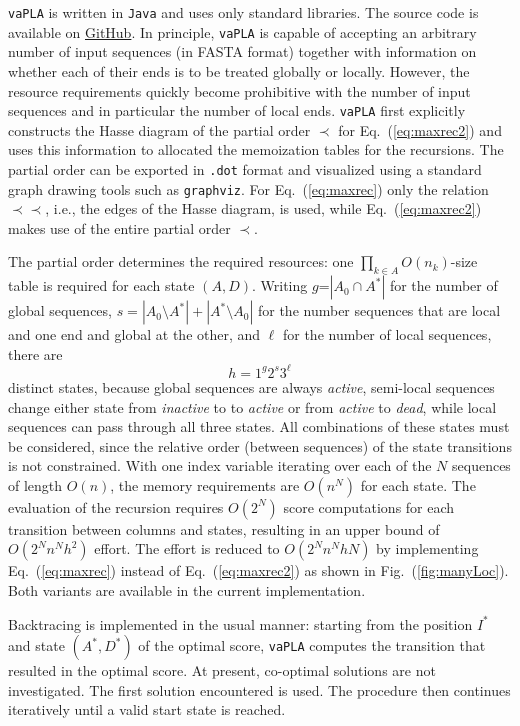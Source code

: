 \documentclass[a4paper,10pt]{article}
\newcommand{\TODO}[1]{\begingroup\color{red}#1\endgroup}
\newcommand{\pprec}{\mathrel{\prec\!\!\!\prec}}
\newcommand{\SAFTWARE}{\texttt{vaPLA}} %
\begin{document}
\SAFTWARE{} is written in \texttt{Java} and uses only standard libraries.
The source code is available on \href{https://github.com/FChurcher/vaPLA}{GitHub}.
In principle, \SAFTWARE{} is capable of accepting an arbitrary number of input
sequences (in FASTA format) together with information on whether each of
their ends is to be treated globally or locally. However, the resource
requirements quickly become prohibitive with the number of input sequences
and in particular the number of local ends. \SAFTWARE{} first explicitly
constructs the Hasse diagram of the partial order $\prec$ for
Eq.~(\ref{eq:maxrec2}) and uses this information to allocated the
memoization tables for the recursions. The partial order can be exported in
\texttt{.dot} format and visualized using a standard graph drawing tools
such as \texttt{graphviz}. For Eq.~(\ref{eq:maxrec}) only the relation
  $\pprec$, i.e., the edges of the Hasse diagram, is used, while
  Eq.~(\ref{eq:maxrec2}) makes use of the entire partial order $\prec$.

The partial order determines the required resources: one
$\prod_{k\in A} O(n_k)$-size table is required for each state $(A,D)$.
Writing $g$=$|A_0\cap A^*|$ for the number of global sequences,
$s=|A_0\setminus A^*| + |A^*\setminus A_0|$ for the number sequences that
are local and one end and global at the other, and $\ell$ for the number of
local sequences, there are
\begin{equation}
  h = 1^g 2^s 3^{\ell} 
\end{equation} 
distinct states, because global sequences are always \textit{active},
semi-local sequences change either state from \textit{inactive} to to
\textit{active} or from \textit{active} to \textit{dead}, while local
sequences can pass through all three states. All combinations of these
states must be considered, since the relative order (between sequences) of
the state transitions is not constrained. With one index variable iterating
over each of the $N$ sequences of length $O(n)$, the memory requirements
are $O(n^N)$ for each state.  The evaluation of the recursion requires
$O(2^N)$ score computations for each transition between columns and states,
resulting in an upper bound of $O(2^N n^N h^2)$ effort. The effort is
reduced to $O(2^N n^N h N)$ by implementing Eq.~(\ref{eq:maxrec})
instead of Eq.~(\ref{eq:maxrec2}) as shown in Fig.~(\ref{fig:manyLoc}).
Both variants are available in the current implementation.

Backtracing is implemented in the usual manner: starting from the position
$I^*$ and state $(A^*,D^*)$ of the optimal score, \SAFTWARE{} computes the
transition that resulted in the optimal score. At present, co-optimal
solutions are not investigated. The first solution encountered is used. The
procedure then continues iteratively until a valid start state is reached.
\end{document}
